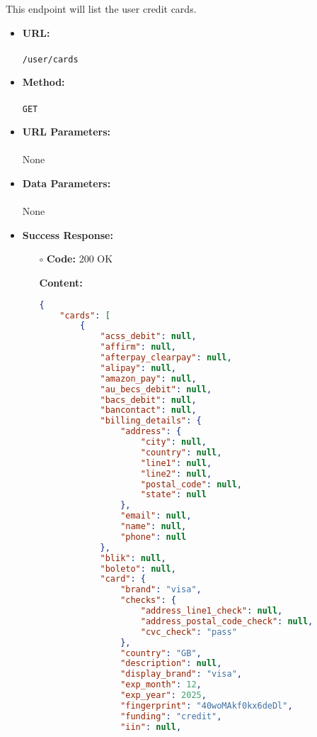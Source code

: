 

This endpoint will list the user credit cards.

\begin{itemize}
    \item \textbf{URL:} \\\\\texttt{/user/cards}
    \item \textbf{Method:} \\\\\texttt{GET}
    \item \textbf{URL Parameters:} \\\\None
    \item \textbf{Data Parameters:} \\\\None
    \item \textbf{Success Response:}
		\begin{itemize}
			\item[$\circ$] \textbf{Code:} 200 OK
			\item[] \textbf{Content:}
			\medskip
			\begin{lstlisting}[language=json]
{
    "cards": [
        {
            "acss_debit": null,
            "affirm": null,
            "afterpay_clearpay": null,
            "alipay": null,
            "amazon_pay": null,
            "au_becs_debit": null,
            "bacs_debit": null,
            "bancontact": null,
            "billing_details": {
                "address": {
                    "city": null,
                    "country": null,
                    "line1": null,
                    "line2": null,
                    "postal_code": null,
                    "state": null
                },
                "email": null,
                "name": null,
                "phone": null
            },
            "blik": null,
            "boleto": null,
            "card": {
                "brand": "visa",
                "checks": {
                    "address_line1_check": null,
                    "address_postal_code_check": null,
                    "cvc_check": "pass"
                },
                "country": "GB",
                "description": null,
                "display_brand": "visa",
                "exp_month": 12,
                "exp_year": 2025,
                "fingerprint": "40woMAkf0kx6deDl",
                "funding": "credit",
                "iin": null,

\end{lstlisting}
\end{itemize}
\end{itemize}
